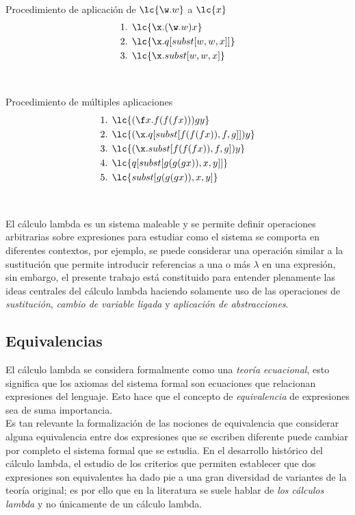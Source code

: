 \begin{ejemplo} Procedimiento de aplicación de \(\lc{\w.w}\) a \(\lc{x}\)
  \label{ejemplo:aplicacion4}
  \begin{align*}
    \text{1. } &\lc{\x.(\w.w)x} \\
    \text{2. } &\lc{\x.q[subst[w,w,x]]} \\
    \text{3. } &\lc{\x.subst[w,w,x]}
  \end{align*}
\end{ejemplo} \

\begin{ejemplo} Procedimiento de múltiples aplicaciones
  \label{ejemplo:aplicacion5}
  \begin{align*}
    \text{1. } &\lc{(\f x.f(f(f x)))g y} \\
    \text{2. } &\lc{(\x.q[subst[f(f(f x)), f, g]]) y} \\
    \text{3. } &\lc{(\x.subst[f(f(f x)), f, g]) y} \\
    \text{4. } &\lc{q[subst[g(g(g x)), x, y]]} \\
    \text{5. } &\lc{subst[g(g(g x)), x, y]}
  \end{align*}
\end{ejemplo} \

El cálculo lambda es un sistema maleable y se permite definir operaciones
arbitrarias sobre expresiones para estudiar como el sistema se comporta en
diferentes contextos, por ejemplo, se puede considerar una operación similar a
la sustitución que permite introducir referencias a una o más \(\lambda\) en una
expresión, sin embargo, el presente trabajo está constituido para entender
plenamente las ideas centrales del cálculo lambda haciendo solamente uso de las
operaciones de \emph{sustitución}, \emph{cambio de variable ligada} y
\emph{aplicación de abstracciones}. \\

\subsection{Equivalencias}

El cálculo lambda se considera formalmente como una \emph{teoría ecuacional},
esto significa que los axiomas del sistema formal son ecuaciones que relacionan
expresiones del lenguaje. Esto hace que el concepto de \emph{equivalencia} de
expresiones sea de suma importancia. \\

Es tan relevante la formalización de las nociones de equivalencia que considerar
alguna equivalencia entre dos expresiones que se escriben diferente puede cambiar
por completo el sistema formal que se estudia. En el desarrollo histórico del
cálculo lambda, el estudio de los criterios que permiten establecer que dos
expresiones son equivalentes ha dado pie a una gran diversidad de variantes de la
teoría original; es por ello que en la literatura se suele hablar de \emph{los
  cálculos lambda} y no únicamente de un cálculo lambda. \\

